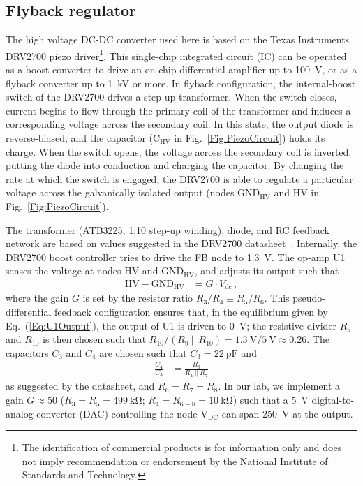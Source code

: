 \documentclass[aip,rsi,reprint]{revtex4-1} %
\begin{document}
\subsection{Flyback regulator}
\label{Sec:DRV2700}

The high voltage DC-DC converter used here is based on the Texas Instruments DRV2700 piezo driver\footnote{The identification of commercial products is for information only and does not imply recommendation or endorsement by the National Institute of Standards and Technology.}.
This single-chip integrated circuit (IC) can be operated as a boost converter to drive an on-chip differential amplifier up to \SI{100}{\volt}, or as a flyback converter up to \SI{1}{\kilo\volt} or more.
In flyback configuration, the internal-boost switch of the DRV2700 drives a step-up transformer.
When the switch closes, current begins to flow through the primary coil of the transformer and induces a corresponding voltage across the secondary coil.
In this state, the output diode is reverse-biased, and the capacitor ($\text{C}_{\text{HV}}$ in Fig.~\ref{Fig:PiezoCircuit}) holds its charge.
When the switch opens, the voltage across the secondary coil is inverted, putting the diode into conduction and charging the capacitor.
By changing the rate at which the switch is engaged, the DRV2700 is able to regulate a particular voltage across the galvanically isolated output (nodes $\text{GND}_\text{HV}$ and HV in Fig.~\ref{Fig:PiezoCircuit}).

The transformer (ATB3225, 1:10 step-up winding), diode, and RC feedback network are based on values suggested in the DRV2700 datasheet~\cite{DRV2700Datasheet,DRV2700EVMUserGuide}.
Internally, the DRV2700 boost controller tries to drive the FB node to \SI{1.3}{\volt}.
The op-amp U1 senses the voltage at nodes HV and $\text{GND}_\text{HV}$, and adjusts its output such that
\begin{align}
\label{Eq:U1Output}
\text{HV} - \text{GND}_{\text{HV}} &= G\cdot V_{\text{dc}}\,,
\end{align}
where the gain $G$ is set by the resistor ratio $R_3/R_4 \equiv R_5/R_6$.
This pseudo-differential feedback configuration ensures that, in the equilibrium given by Eq.~(\ref{Eq:U1Output}), the output of U1 is driven to \SI{0}{\volt}; the resistive divider $R_9$ and $R_{10}$ is then chosen such that $R_{10}/(R_9~||~R_{10}) = \SI{1.3}{\volt}/\SI{5}{\volt} \approx \num{0.26}$.
The capacitors $C_3$ and $C_4$ are chosen such that $C_3 = \SI{22}{\pico\farad}$ and
\begin{align}
\frac{C_4}{C_3} &= \frac{R_3}{R_4~||~R_7}
\end{align}
as suggested by the datasheet, and $R_6 = R_7 = R_8$.
In our lab, we implement a gain $G\approx 50$ ($R_3 = R_5 = \SI{499}{\kilo\ohm}$; $R_4 = R_{6-8} = \SI{10}{\kilo\ohm}$) such that a \SI{5}{\volt} digital-to-analog converter (DAC) controlling the node $\text{V}_\text{DC}$ can span \SI{250}{\volt} at the output.
\end{document}
